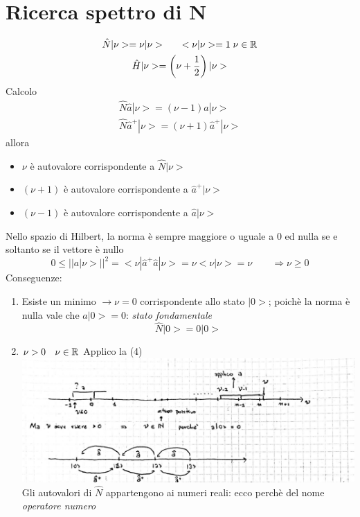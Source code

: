 \section{Ricerca spettro di N}

\begin{gather*}
    \hat{N}|\nu> = \nu|\nu> \qquad <\nu|\nu> = 1 \; \nu\in \mathbb{R} \\
    \hat{H}|\nu> = \left(\nu + \frac{1}{2}\right)|\nu>
\end{gather*}
Calcolo
\begin{gather}
    \boxed{\hat{N}\hat{a}|\nu> = (\nu-1)\hat{a}|\nu>} \tag{4} \\
    \hat{N}\hat{a}^+ |\nu> = (\nu+1) \hat{a}^+|\nu> \tag{5}
\end{gather}
allora
\begin{itemize}
    \item \(\nu\) è autovalore corrispondente a \(\hat{N}|\nu>\)
    \item \((\nu+1)\) è autovalore corrispondente a \(\hat{a}^+|\nu>\)
    \item \((\nu-1)\) è autovalore corrispondente a \(\hat{a}|\nu>\)
\end{itemize}
Nello spazio di Hilbert, la norma è sempre maggiore o uguale a 0 ed nulla se e soltanto se il vettore è nullo
\begin{equation*}
    0 \leq {||a|\nu>||}^2 = <\nu|\hat{a}^+\hat{a}|\nu> = \nu <\nu|\nu> = \nu \qquad \Rightarrow \nu \geq 0
\end{equation*}
Conseguenze:
\begin{enumerate}
    \item Esiste un minimo \(\rightarrow \nu =0\) corrispondente allo stato \(|0>\); poichè la norma è nulla vale che \(a|0> = 0\): \textit{stato fondamentale}
    \begin{equation*}
        \hat{N}|0> = 0|0> 
    \end{equation*}
    \item \(\nu>0 \quad \nu \in \mathbb{R} \) \newline
    Applico la (4) \newline
    \includegraphics[width=\linewidth]{immagini/oscillatore_armonico1.jpg}
    Gli autovalori di \(\hat{N}\) appartengono ai numeri reali: ecco perchè del nome \textit{operatore numero}
\end{enumerate}

